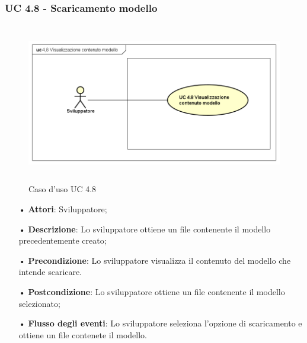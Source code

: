 \subsubsection{UC 4.8 - Scaricamento modello}
\begin{figure}[H]
	\centering
	\includegraphics[width=17cm, height=7cm]{img/UC480.png} 
	\caption{Caso d'uso UC 4.8}\label{fig:480}
\end{figure}
\begin{itemize}
\item[•]\textbf{Attori}: Sviluppatore;
\item[•]\textbf{Descrizione}: Lo sviluppatore ottiene un file contenente il modello precedentemente creato;
\item[•]\textbf{Precondizione}: Lo sviluppatore visualizza il contenuto del modello che intende scaricare.
\item[•]\textbf{Postcondizione}: Lo sviluppatore ottiene un file contenente il modello selezionato;
\item[•]\textbf{Flusso degli eventi}:  Lo sviluppatore seleziona l'opzione di scaricamento e ottiene un file contenete il modello.
\end{itemize}

